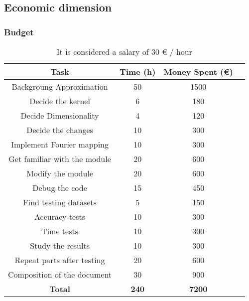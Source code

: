 \documentclass[a4paper]{article}
\begin{document}



        \subsection{Economic dimension}
            \subsubsection{Budget}

            \begin{table}
                \centering
                \begin{tabular}{|c|c|c|c|}
                    \hline
                    \textbf{Task} & \textbf{Time (h)} & \textbf{Money Spent (€)} \\
                    \hline
                    Backgroung Approximation & 50 & 1500 \\
                    \hline
                    Decide the kernel & 6 & 180 \\
                    \hline
                    Decide Dimensionality & 4 & 120 \\
                    \hline
                    Decide the changes & 10 & 300 \\
                    \hline
                    Implement Fourier mapping & 10 & 300 \\
                    \hline
                    Get familiar with the module & 20 & 600 \\
                    \hline
                    Modify the module & 20 & 600 \\
                    \hline
                    Debug the code & 15 & 450 \\
                    \hline
                    Find testing datasets & 5 & 150 \\
                    \hline
                    Accuracy tests & 10 & 300 \\
                    \hline
                    Time tests & 10 & 300 \\
                    \hline
                    Study the results & 10 & 300 \\
                    \hline
                    Repeat parts after testing & 20 & 600 \\
                    \hline
                    Composition of the document & 30 & 900 \\
                    \hline
                    \textbf{Total} & \textbf{240} & \textbf{7200} \\
                    \hline

                \end{tabular}
                \caption{It is considered a salary of 30 € / hour}
                \label{Tab:1}
            \end{table}
\end{document}
